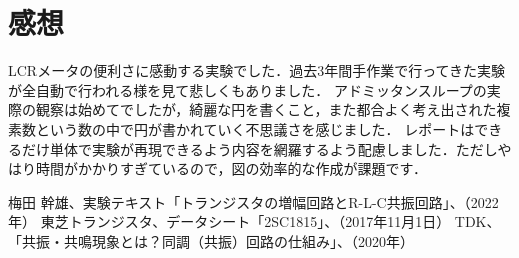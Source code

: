 \documentclass[dvipdfmx,titlepage,a4j]{jsarticle}  %
\numberwithin{equation}{section}
\begin{document}
\section{感想}
LCRメータの便利さに感動する実験でした．過去3年間手作業で行ってきた実験が全自動で行われる様を見て悲しくもありました．
アドミッタンスループの実際の観察は始めてでしたが，綺麗な円を書くこと，また都合よく考え出された複素数という数の中で円が書かれていく不思議さを感じました．
レポートはできるだけ単体で実験が再現できるよう内容を網羅するよう配慮しました．ただしやはり時間がかかりすぎているので，図の効率的な作成が課題です．

\begin{thebibliography}{99}
   梅田 幹雄、実験テキスト「トランジスタの増幅回路とR-L-C共振回路」、（2022年）
   東芝トランジスタ、データシート「2SC1815」、（2017年11月1日）
  TDK、「共振・共鳴現象とは？同調（共振）回路の仕組み」、（2020年）
\end{thebibliography}
\end{document}
